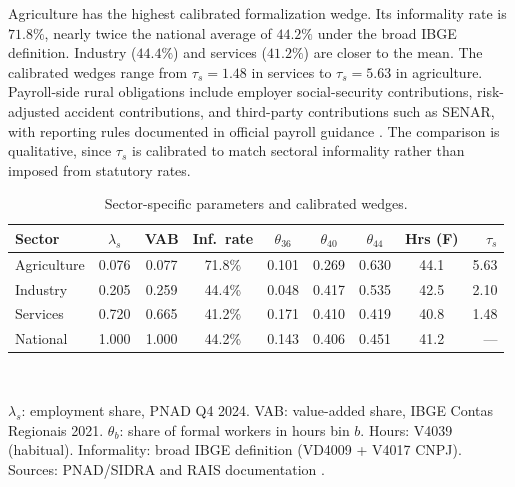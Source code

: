 
Agriculture has the highest calibrated formalization wedge. Its informality rate is $71.8\%$, nearly twice the national average of $44.2\%$ under the broad IBGE definition. Industry ($44.4\%$) and services ($41.2\%$) are closer to the mean. The calibrated wedges range from $\tau_s=1.48$ in services to $\tau_s=5.63$ in agriculture. Payroll-side rural obligations include employer social-security contributions, risk-adjusted accident contributions, and third-party contributions such as SENAR, with reporting rules documented in official payroll guidance \citep{BrasilLei8212,ReceitaESocialRural2021}. The comparison is qualitative, since $\tau_s$ is calibrated to match sectoral informality rather than imposed from statutory rates.

\begin{table}[htbp]
\centering
\caption{Sector-specific parameters and calibrated wedges.}\label{tab:sectoral_params}
\small
\begin{tabular}{lcccccccr}
\hline\hline
Sector & $\lambda_s$ & VAB & Inf.\ rate & $\theta_{36}$ & $\theta_{40}$ & $\theta_{44}$ & Hrs (F) & $\tau_s$ \\
\hline
Agriculture & 0.076 & 0.077 & 71.8\% & 0.101 & 0.269 & 0.630 & 44.1 & 5.63 \\
Industry    & 0.205 & 0.259 & 44.4\% & 0.048 & 0.417 & 0.535 & 42.5 &  2.10 \\
Services    & 0.720 & 0.665 & 41.2\% & 0.171 & 0.410 & 0.419 & 40.8 &  1.48 \\
\hline
National    & 1.000 & 1.000 & 44.2\% & 0.143 & 0.406 & 0.451 & 41.2 & --- \\
\hline\hline
\end{tabular}
\\[2pt]
\begin{minipage}{0.95\textwidth}
\justifying
{\footnotesize $\lambda_s$: employment share, PNAD Q4 2024. VAB: value-added share, IBGE Contas Regionais 2021. $\theta_b$: share of formal workers in hours bin $b$. Hours: V4039 (habitual). Informality: broad IBGE definition (VD4009 + V4017 CNPJ). Sources: PNAD/SIDRA and RAIS documentation \citep{PNAD2025,RAIS2022}.}
\end{minipage}
\end{table}

